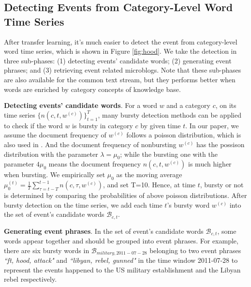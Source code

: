 \documentclass[runningheads,a4paper]{llncs}
\theoremstyle{exampstyle}
\begin{document}
\subsection{Detecting Events from Category-Level Word Time Series}
\label{subsec:detection}
After transfer learning, it's much easier to detect the event from category-level word time series, which is shown in Figure \ref{fig:hood}. We take the detection in three sub-phases: (1) detecting events' candidate words; (2) generating event phrases; and (3) retrieving event related microblogs.
Note that these sub-phases are also available for the common text stream, but they performs better when words are enriched by category concepts of knowledge base.

\textbf{Detecting events' candidate words}. For a word \(w\) and a category \(c\), on its time series \(\{n(c,t,w^{(c)})\}_{t=1}^{T}\), many bursty detection methods can be applied to check if the word \(w\) is bursty in category \(c\) by given time \(t\). 
In our paper, we assume the document frequency of \(w^{(c)}\) follows a poisson distribution, which is also used in \cite{Diao:2012wj}.
And the document frequency of nonbursting \(w^{(c)}\) has the possison distribution with the parameter \(\lambda=\mu_0\); while the bursting one with the parameter \(4\mu_0\) means the document frequency \(n(c,t,w^{(c)})\) is much higher when bursting.
We empirically set \(\mu_0\) as the moving average \(\mu_0^{(t)}=\frac{1}{T}\sum_{\tau=t-T}^{t-1}n(c,\tau,w^{(c)})\), and set T=10.
Hence, at time \(t\), bursty or not is determined by comparing the probabilities of above poisson distributions. 
After bursty detection on the time series, we add each time \(t\)'s bursty word \(w^{(c)}\) into the set of event's candidate words \(\mathcal{B}_{c,t}\).

\textbf{Generating event phrases}. 
In the set of event's candidate words \(\mathcal{B}_{c,t}\), some words appear together and should be grouped into event phrases.
For example, there are six bursty words in \(\mathcal{B}_{military,2011-07-28}\) belonging to two event phrases \textit{``ft, hood, attack"} and \textit{``libyan, rebel, gunned"} in the time window 2011-07-28 to represent the events happened to the US military establishment and the Libyan rebel respectively. 
\end{document}
